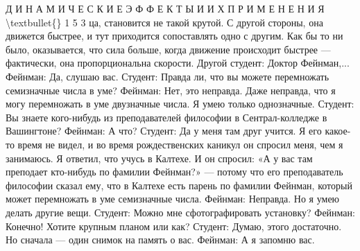 \documentclass[10pt,oneside]{article}
\begin{document}
Д И Н А М И Ч Е С К И Е  Э Ф Ф Е К Т Ы  И  И Х  П Р И М Е Н Е Н И Я \textbackslash{}textbullet\{\} 1 5 3 ца, становится не такой крутой. С другой стороны, она движется быстрее, и тут приходится сопоставлять одно с другим. Как бы то ни было, оказывается, что сила больше, когда движение происходит быстрее --- фактически, она пропорциональна скорости. Другой студент: Доктор Фейнман,... Фейнман: Да, слушаю вас. Студент: Правда ли, что вы можете перемножать семизначные числа в уме? Фейнман: Нет, это неправда. Даже неправда, что я могу перемножать в уме двузначные числа. Я умею только однозначные. Студент: Вы знаете кого-нибудь из преподавателей философии в Сентрал-колледже в Вашингтоне? Фейнман: А что? Студент: Да у меня там друг учится. Я его какое-то время не видел, и во время рождественских каникул он спросил меня, чем я занимаюсь. Я ответил, что учусь в Калтехе. И он спросил: «А у вас там преподает кто-нибудь по фамилии Фейнман?» --- потому что его преподаватель философии сказал ему, что в Калтехе есть парень по фамилии Фейнман, который может перемножать в уме семизначные числа. Фейнман: Неправда. Но я умею делать другие вещи. Студент: Можно мне сфотографировать установку? Фейнман: Конечно! Хотите крупным планом или как? Студент: Думаю, этого достаточно. Но сначала --- один снимок на память о вас. Фейнман: А я запомню вас.\par

\clearpage
{}
\end{document}
